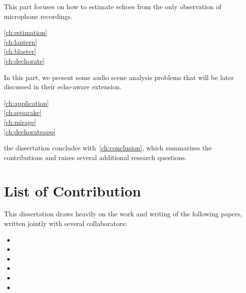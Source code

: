 This part focuses on how to estimate echoes from the only observation of microphone recordings.
\begin{description}
    \item[\cref{ch:estimation}]\synopsisChEstimation
    \item[\cref{ch:lantern}]\synopsisChLantern
    \item[\cref{ch:blaster}]\synopsisChBlaster
    \item[\cref{ch:dechorate}]\synopsisChDechorate
\end{description}


In this part, we present some audio scene analysis problems that will be later discussed in their echo-aware extension.

\begin{description}
\item[\cref{ch:application}]\synopsisChApplication
\item[\cref{ch:separake}]\synopsisChSeparake
\item[\cref{ch:mirage}]\synopsisChMirage
\item[\cref{ch:dechorateapp}]\synopsisChDecharateApp
\end{description}

 the dissertation concludes with~\cref{ch:conclusion}, which summarizes the contributions and raises several additional research questions.

\newpage
\section{List of Contribution}
This dissertation draws heavily on the work and writing of the following papers, written jointly with several collaborators:

\begin{itemize}
    \item {}
    \item {}
    \item {}
    \item {}
    \item {}
    \item {}
\end{itemize}

